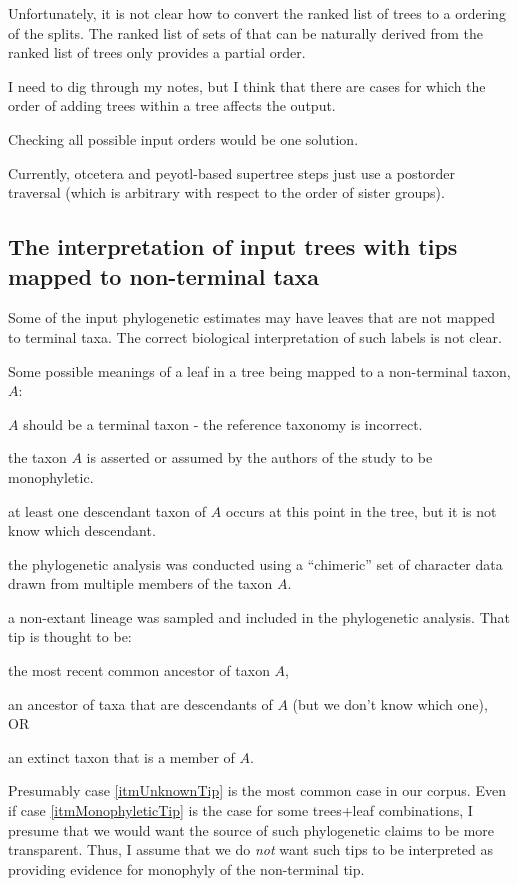 \documentclass[11pt]{article}
\begin{document}
Unfortunately, it is not clear how to convert the ranked list of trees to a ordering of the splits.
The ranked list of sets of \pss that can be naturally derived from the ranked list of trees only provides
    a partial order.

I need to dig through my notes, but I think that there are cases for which the order of adding trees within
    a tree affects the output.

Checking all possible input orders would be one solution. 

Currently, otcetera and peyotl-based supertree steps just use a postorder traversal (which is arbitrary with
    respect to the order of sister groups). \NeedsAlgorithmicWork

\subsection{The interpretation of input trees with tips mapped to non-terminal taxa}
Some of the input phylogenetic estimates may have leaves that are not mapped to terminal taxa.
The correct biological interpretation of such labels is not clear.

Some possible meanings of a leaf in a tree being mapped to a non-terminal taxon, $A$:
\begin{compactenum}
    \item $A$ should be a terminal taxon - the reference taxonomy is incorrect.
    \item the taxon $A$ is asserted or assumed by the authors of the study to be monophyletic.\label{itmMonophyleticTip}
    \item at least one descendant taxon of $A$ occurs at this point in the tree, but it is not know which descendant.\label{itmUnknownTip}
    \item the phylogenetic analysis was conducted using a ``chimeric'' set of character data drawn from multiple
        members of the taxon $A$.
    \item a non-extant lineage was sampled and included in the phylogenetic analysis. That tip is thought to be:
    \begin{compactenum}
        \item the most recent common ancestor of taxon $A$,
        \item an ancestor of taxa that are descendants of $A$ (but we don't know which one), OR
        \item an extinct taxon that is a member of $A$.
    \end{compactenum}
\end{compactenum}
Presumably case \ref{itmUnknownTip} is the most common case in our corpus.
Even if case \ref{itmMonophyleticTip} is the case for some trees+leaf combinations, I presume
    that we would want the source of such phylogenetic claims to be more transparent.
Thus, I assume that we do {\em not} want such tips to be interpreted as providing evidence
    for monophyly of the non-terminal tip.
\end{document}
